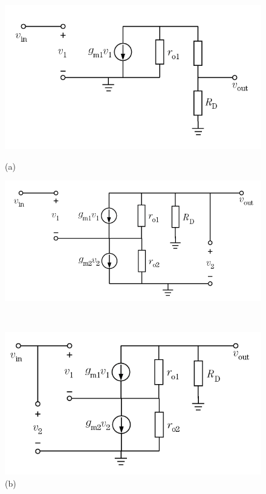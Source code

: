 \documentclass[hyperref, UTF8]{ctexart}
\begin{document}
    \begin{figure}[!htb]
        \centering
        \begin{minipage}[t]{0.409\textwidth}
        \centering
        \includegraphics[width=1\textwidth]{p6-38-a-sol.png}
        \caption*{(a)}
        \end{minipage}
        \begin{minipage}[t]{0.463\textwidth}
        \centering
        \includegraphics[width=1\textwidth]{p6-38-b-sol.png}
        \caption*{(b)}
        \end{minipage}
        \\
        \begin{minipage}[t]{0.397\textwidth}
        \centering
        \includegraphics[width=1\textwidth]{p6-38-c-sol.png}

\end{minipage}
\end{figure}
\end{document}
